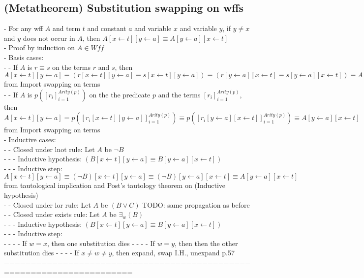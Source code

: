 \documentclass{article}
\begin{document}
\subsection{(Metatheorem) Substitution swapping on wffs}
	- For any wff $A$ and term $t$ and constant $a$ and variable $x$ and variable $y$, if $y \neq x$ and $y$ does not occur in $A$, then $A[x \leftarrow t][y \leftarrow a] \equiv A[y \leftarrow a][x \leftarrow t]$ \\
	- Proof by induction on $A \in Wff$ \\
	- Basis cases: \\
		- - If $A$ is $r \equiv s$ on the terms $r$ and $s$, then $A[x \leftarrow t][y \leftarrow a] \equiv (r[x \leftarrow t][y \leftarrow a] \equiv s[x \leftarrow t][y \leftarrow a]) \equiv (r[y \leftarrow a][x \leftarrow t] \equiv s[y \leftarrow a][x \leftarrow t]) \equiv A[y \leftarrow a][x \leftarrow t]$ from Import swapping on terms \\
		- - If $A$ is $p([r_i]_{i=1}^{Arity(p)})$ on the the predicate $p$ and the terms $[r_i]_{i=1}^{Arity(p)}$, then $A[x \leftarrow t][y \leftarrow a] = p([r_i[x \leftarrow t][y \leftarrow a]]_{i=1}^{Arity(p)}) \equiv p([r_i[y \leftarrow a][x \leftarrow t]]_{i=1}^{Arity(p)}) \equiv A[y \leftarrow a][x \leftarrow t]$ from Import swapping on terms \\
	- Inductive cases: \\
		- - Closed under lnot rule: Let $A$ be $\lnot B$ \\
			- - - Inductive hypothesis: $(B[x \leftarrow t][y \leftarrow a] \equiv B[y \leftarrow a][x \leftarrow t])$ \\
			- - - Inductive step: $A[x \leftarrow t][y \leftarrow a] \equiv (\lnot B)[x \leftarrow t][y \leftarrow a] \equiv (\lnot B)[y \leftarrow a][x \leftarrow t] \equiv A[y \leftarrow a][x \leftarrow t]$ from tautological implication and Post's tautology theorem on (Inductive hypothesis) \\
		- - Closed under lor rule: Let $A$ be $(B \lor C)$ TODO: same propagation as before \\
		- - Closed under exists rule: Let $A$ be $\exists_w(B)$ \\
			- - - Inductive hypothesis: $(B[x \leftarrow t][y \leftarrow a] \equiv B[y \leftarrow a][x \leftarrow t])$ \\
			- - - Inductive step: \\
				- - - - If $w = x$, then one substitution dies
				- - - - If $w = y$, then then the other substitution dies
				- - - - If $x \neq w \neq y$, then expand, swap I.H., unexpand p.57
	======================================================================
\end{document}
